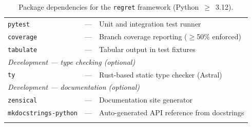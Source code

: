 \begin{longtable}{p{3cm}p{3cm}p{8cm}}
  \hline
  \texttt{pytest}~\cite{pytest}    & --- & Unit and integration test runner \\
  \texttt{coverage}~\cite{coverage}  & --- & Branch coverage
  reporting ($\geq$50\% enforced) \\
  \texttt{tabulate}  & --- & Tabular output in test fixtures \\
  \hline
  \multicolumn{3}{l}{\textit{Development --- type checking (optional)}} \\
  \hline
  \texttt{ty}~\cite{ty} & --- & Rust-based static type checker (Astral) \\
  \hline
  \multicolumn{3}{l}{\textit{Development --- documentation (optional)}} \\
  \hline
  \texttt{zensical}              & --- & Documentation site generator \\
  \texttt{mkdocstrings-python}   & --- & Auto-generated API
  reference from docstrings \\
  \hline
  \caption[Table of software prerequisites]{%
    Package dependencies for the \texttt{regret} framework (Python~$\geq$~3.12).
  }
  \label{tab:dependencies}
\end{longtable}
